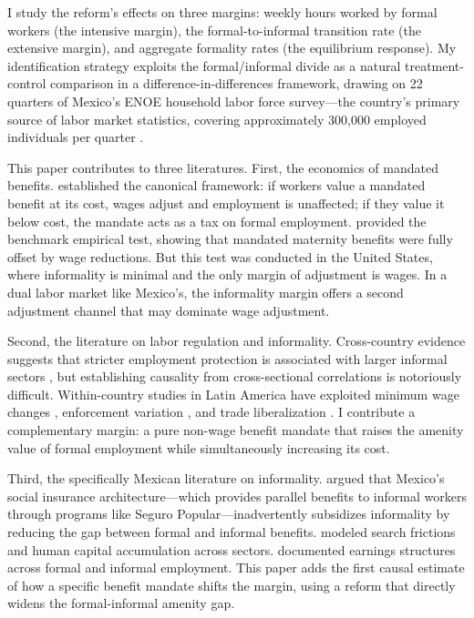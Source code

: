 \documentclass[12pt]{article}
\begin{document}
I study the reform's effects on three margins: weekly hours worked by formal workers (the intensive margin), the formal-to-informal transition rate (the extensive margin), and aggregate formality rates (the equilibrium response). My identification strategy exploits the formal/informal divide as a natural treatment-control comparison in a difference-in-differences framework, drawing on 22 quarters of Mexico's ENOE household labor force survey---the country's primary source of labor market statistics, covering approximately 300,000 employed individuals per quarter \citep{inegi_enoe}.

This paper contributes to three literatures. First, the economics of mandated benefits. \citet{summers1989} established the canonical framework: if workers value a mandated benefit at its cost, wages adjust and employment is unaffected; if they value it below cost, the mandate acts as a tax on formal employment. \citet{gruber1994} provided the benchmark empirical test, showing that mandated maternity benefits were fully offset by wage reductions. But this test was conducted in the United States, where informality is minimal and the only margin of adjustment is wages. In a dual labor market like Mexico's, the informality margin offers a second adjustment channel that may dominate wage adjustment.

Second, the literature on labor regulation and informality. Cross-country evidence suggests that stricter employment protection is associated with larger informal sectors \citep{botero2004, schneider2010}, but establishing causality from cross-sectional correlations is notoriously difficult. Within-country studies in Latin America have exploited minimum wage changes \citep{bosch2010, meghir2015}, enforcement variation \citep{almeida2012, ronconi2010}, and trade liberalization \citep{goldberg2003, dix-carneiro2021}. I contribute a complementary margin: a pure non-wage benefit mandate that raises the amenity value of formal employment while simultaneously increasing its cost.

Third, the specifically Mexican literature on informality. \citet{levy2008} argued that Mexico's social insurance architecture---which provides parallel benefits to informal workers through programs like Seguro Popular---inadvertently subsidizes informality by reducing the gap between formal and informal benefits. \citet{bobba2021} modeled search frictions and human capital accumulation across sectors. \citet{bargain2012} documented earnings structures across formal and informal employment. This paper adds the first causal estimate of how a specific benefit mandate shifts the margin, using a reform that directly widens the formal-informal amenity gap.
\end{document}
